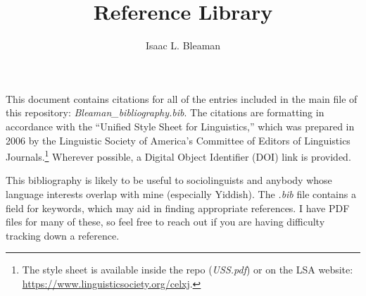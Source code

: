\documentclass[12pt]{article}
\title{Reference Library}
\author{Isaac L. Bleaman}
\begin{document}
	\maketitle
	
	This document contains citations for all of the entries included in the main  file of this repository: \textit{Bleaman\_bibliography.bib}. The citations are formatting in accordance with the ``Unified Style Sheet for Linguistics,'' which was prepared in 2006 by the Linguistic Society of America's Committee of Editors of Linguistics Journals.\footnote{The style sheet is available inside the repo (\textit{USS.pdf}) or on the LSA website: \url{https://www.linguisticsociety.org/celxj}.} Wherever possible, a Digital Object Identifier (DOI) link is provided.
	
	This bibliography is likely to be useful to sociolinguists and anybody whose language interests overlap with mine (especially Yiddish). The \textit{.bib} file contains a field for keywords, which may aid in finding appropriate references. I have PDF files for many of these, so feel free to reach out if you are having difficulty tracking down a reference.
	
	\nocite{*}
	
	\newpage
	
	
	
\end{document}
